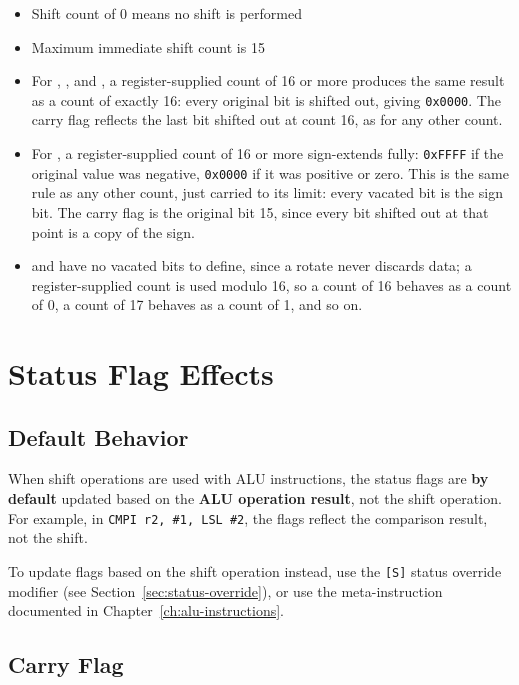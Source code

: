 \begin{itemize}
	\item Shift count of 0 means no shift is performed
	\item Maximum immediate shift count is 15
	\item For , , and , a register-supplied count of 16 or more produces the same
	      result as a count of exactly 16: every original bit is shifted out, giving \texttt{0x0000}. The carry flag reflects the
	      last bit shifted out at count 16, as for any other count.
	\item For , a register-supplied count of 16 or more sign-extends fully: \texttt{0xFFFF} if the original value
	      was negative, \texttt{0x0000} if it was positive or zero. This is the same rule as any other count, just carried to its
	      limit: every vacated bit is the sign bit. The carry flag is the original bit 15, since every bit shifted out at that
	      point is a copy of the sign.
	\item {} and  have no vacated bits to define, since a rotate never discards data; a
	      register-supplied count is used modulo 16, so a count of 16 behaves as a count of 0, a count of 17 behaves
	      as a count of 1, and so on.
\end{itemize}

\section{Status Flag Effects}

\subsection{Default Behavior}

When shift operations are used with ALU instructions, the status flags are \textbf{by default} updated based on the
\textbf{ALU operation result}, not the shift operation. For example, in \texttt{CMPI r2, \#1, LSL \#2}, the flags
reflect the comparison result, not the shift.

To update flags based on the shift operation instead, use the \texttt{[S]} status override modifier (see
Section~\ref{sec:status-override}), or use the  meta-instruction documented in
Chapter~\ref{ch:alu-instructions}.

\subsection{Carry Flag}

